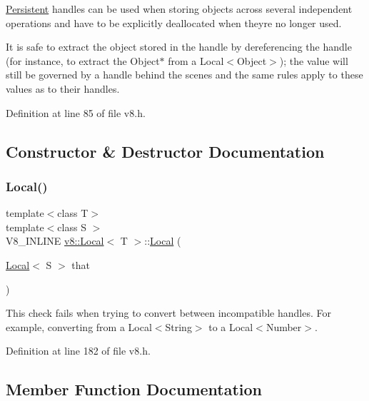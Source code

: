 \mbox{\hyperlink{classv8_1_1Persistent}{Persistent}} handles can be used when storing objects across several independent operations and have to be explicitly deallocated when they\textquotesingle{}re no longer used.

It is safe to extract the object stored in the handle by dereferencing the handle (for instance, to extract the Object$\ast$ from a Local$<$\+Object$>$); the value will still be governed by a handle behind the scenes and the same rules apply to these values as to their handles. 

Definition at line 85 of file v8.\+h.



\subsection{Constructor \& Destructor Documentation}
\mbox{\label{classv8_1_1Local_a18d761713c1062a38f58a568fffe8f80}} 
\subsubsection{\texorpdfstring{Local()}{Local()}}
{\footnotesize\ttfamily template$<$class T$>$ \\
template$<$class S $>$ \\
V8\+\_\+\+I\+N\+L\+I\+NE \mbox{\hyperlink{classv8_1_1Local}{v8\+::\+Local}}$<$ T $>$\+::\mbox{\hyperlink{classv8_1_1Local}{Local}} (\begin{DoxyParamCaption}\item[{\mbox{\hyperlink{classv8_1_1Local}{Local}}$<$ S $>$}]{that }\end{DoxyParamCaption})\hspace{0.3cm}{\ttfamily [inline]}}

This check fails when trying to convert between incompatible handles. For example, converting from a Local$<$\+String$>$ to a Local$<$\+Number$>$.

Definition at line 182 of file v8.\+h.



\subsection{Member Function Documentation}
\mbox{\label{classv8_1_1Local_afa242d21780a729341644a615c4e6ea1}} 
